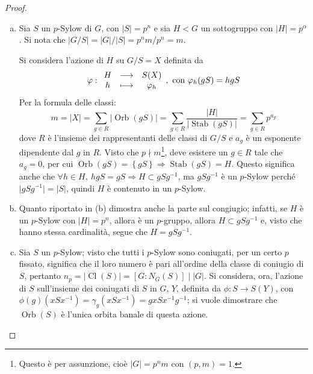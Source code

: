 \documentclass[11pt]{article}
\theoremstyle{style}
\numberwithin{equation}{subsection}
\begin{document}
\begin{proof}
\begin{enumerate}[(a).]
				Quindi, si ha $\lvert \operatorname{Stab}(M_i)  \rvert \ge p^\alpha $ e si dimostra che $\lvert \operatorname{Stab} (M_i) \rvert = p^\alpha $.
				Per farlo, si considera la mappa $\operatorname{Stab} (M_i) \longrightarrow M_i$ tale che $\operatorname{Stab}( M_i)\ni y\longmapsto yx$, per $x \in  M_i$, \`e iniettiva perch\'e $yx = y_1 x \iff y=  y_1$, quindi $\operatorname{Stab} (M_i) \le \lvert M_i\rvert =p^\alpha $, da cui $\lvert \operatorname{Stab} (M_i) \rvert = p^\alpha $. 
				Essendo $\operatorname{Stab} (M_i) < G$, significa che in $G$ esiste un sottogruppo di ordine $p^\alpha $.
			\item Sia $S$ un $p$-Sylow di $G$, con $\lvert S \rvert = p^n$ e sia $H < G$ un sottogruppo con $\lvert H \rvert =p^\alpha $.
				Si nota che $\lvert G / S \rvert = \lvert  G \rvert / \lvert S \rvert = p^n m/ p^n = m$.

				Si considera l'azione di $H$ su $G / S = X$ definita da
				\[
					\varphi : 
					\begin{array}
						{c c c}
						H &\longrightarrow & S(X)\\
						h&\longmapsto & \varphi _h
					\end{array}, \text{ con } \varphi _h(gS) = hgS
				\] 
				Per la formula delle classi:
				\[
				m = \lvert X \rvert = \sum_{g \in R}^{} \lvert \operatorname{Orb} (g S) \rvert = \sum_{g \in R}^{} \frac{\lvert H \rvert }{\lvert \operatorname{Stab} (gS) \rvert } = \sum_{g \in R}^{} p^{a _g} 
				\] 
				dove $R$ \`e l'insieme dei rappresentanti delle classi di $G/S$ e $a_g$ \`e un esponente dipendente dal $g$ in $R$.
				Visto che $p  \nmid m $\footnote{Questo \`e per assunzione, cio\`e $\lvert G \rvert =p^n m $ con $(p,m) = 1$.}, deve esistere un $g \in R$ tale che $a_g=0$, per cui $\operatorname{Orb} (gS) = \left\{ gS \right\} \Rightarrow \operatorname{Stab} (gS) = H$.
				Questo significa anche che $\forall h\in H, \ hgS = gS \Rightarrow H \subset gSg^{-1}$, ma $gSg^{-1}$ \`e un $p$-Sylow perch\'e $\lvert gSg^{-1} \rvert = \lvert S \rvert $, quindi $H$ \`e contenuto in un $p$-Sylow.
			\item Quanto riportato in (b) dimostra anche la parte sul congiugio; infatti, se $H$ \`e un $p$-Sylow con $\lvert H\rvert = p^n$, allora \`e un $p$-gruppo, allora $H \subset gSg^{-1}$ e, visto che hanno stessa cardinalit\`a, segue che $H = g S g^{-1}$.
			\item Sia $S$ un $p$-Sylow; visto che tutti i $p$-Sylow sono coniugati, per un certo $p$ fissato, significa che il loro numero \`e pari all'ordine della classe di coniugio di $S$, pertanto $n_p = \lvert \operatorname{Cl} (S) \rvert  = [G:N_G(S)]  \mid  |G|$.
				Si considera, ora, l'azione di $S$ sull'insieme dei coniugati di $S$ in $G$, $Y$, definita da $\phi :S \to S(Y)$, con $\phi (g)(xSx^{-1}) = \gamma_g (xSx^{-1}) = gxSx^{-1}g^{-1}$; si vuole dimostrare che $\operatorname{Orb} (S)$ \`e l'unica orbita banale di questa azione.


\end{enumerate}
\end{proof}
\end{document}
